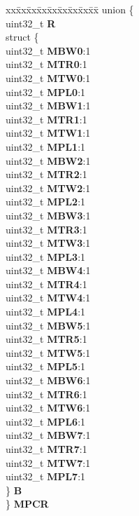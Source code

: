\begin{DoxyCompactItemize}
\begin{tabbing}
\end{tabbing}\item 
\mbox{\label{structPBRIDGE__B__tag_a79acaebf0803905b8226b3e4b6be984d}} 
\begin{tabbing}
xx\=xx\=xx\=xx\=xx\=xx\=xx\=xx\=xx\=\kill
union \{\\
\>uint32\_t {\bfseries R}\\
\>struct \{\\
\>\>uint32\_t {\bfseries MBW0}:1\\
\>\>uint32\_t {\bfseries MTR0}:1\\
\>\>uint32\_t {\bfseries MTW0}:1\\
\>\>uint32\_t {\bfseries MPL0}:1\\
\>\>uint32\_t {\bfseries MBW1}:1\\
\>\>uint32\_t {\bfseries MTR1}:1\\
\>\>uint32\_t {\bfseries MTW1}:1\\
\>\>uint32\_t {\bfseries MPL1}:1\\
\>\>uint32\_t {\bfseries MBW2}:1\\
\>\>uint32\_t {\bfseries MTR2}:1\\
\>\>uint32\_t {\bfseries MTW2}:1\\
\>\>uint32\_t {\bfseries MPL2}:1\\
\>\>uint32\_t {\bfseries MBW3}:1\\
\>\>uint32\_t {\bfseries MTR3}:1\\
\>\>uint32\_t {\bfseries MTW3}:1\\
\>\>uint32\_t {\bfseries MPL3}:1\\
\>\>uint32\_t {\bfseries MBW4}:1\\
\>\>uint32\_t {\bfseries MTR4}:1\\
\>\>uint32\_t {\bfseries MTW4}:1\\
\>\>uint32\_t {\bfseries MPL4}:1\\
\>\>uint32\_t {\bfseries MBW5}:1\\
\>\>uint32\_t {\bfseries MTR5}:1\\
\>\>uint32\_t {\bfseries MTW5}:1\\
\>\>uint32\_t {\bfseries MPL5}:1\\
\>\>uint32\_t {\bfseries MBW6}:1\\
\>\>uint32\_t {\bfseries MTR6}:1\\
\>\>uint32\_t {\bfseries MTW6}:1\\
\>\>uint32\_t {\bfseries MPL6}:1\\
\>\>uint32\_t {\bfseries MBW7}:1\\
\>\>uint32\_t {\bfseries MTR7}:1\\
\>\>uint32\_t {\bfseries MTW7}:1\\
\>\>uint32\_t {\bfseries MPL7}:1\\
\>\} {\bfseries B}\\
\} {\bfseries MPCR}\\


\end{tabbing}
\end{DoxyCompactItemize}
